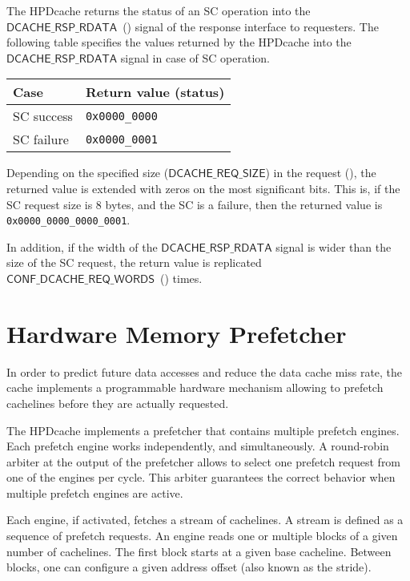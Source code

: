 \documentclass[10pt,titlepage,twoside]{book}
\begin{document}
The \ac{HPDcache} returns the status of an \ac{SC} operation into the $\mathsf{DCACHE\_RSP\_RDATA}$~() signal of the response interface to requesters.
The following table specifies the values returned by the \ac{HPDcache} into the $\mathsf{DCACHE\_RSP\_RDATA}$ signal in case of \ac{SC} operation.

\begin{center}
  {\small%
    \begin{tabular}{p{.15\linewidth}p{.20\linewidth}}
    \toprule
    \textbf{Case}
    & \textbf{Return value (status)}\\
    \midrule
    SC success
    & \texttt{0x0000\_0000} \\
    \midrule
    SC failure
    & \texttt{0x0000\_0001} \\
    \bottomrule
  \end{tabular}}
\end{center}

Depending on the specified size ($\mathsf{DCACHE\_REQ\_SIZE}$) in the request (), the returned value is extended with zeros on the most significant bits.
This is, if the SC request size is 8 bytes, and the SC is a failure, then the returned value is \texttt{0x0000\_0000\_0000\_0001}.

In addition, if the width of the $\mathsf{DCACHE\_RSP\_RDATA}$ signal is wider than the size of the SC request, the return value is replicated $\mathsf{CONF\_DCACHE\_REQ\_WORDS}$~() times.


\chapter{Hardware Memory Prefetcher}
\minitoc
\newpage

In order to predict future data accesses and reduce the data cache miss rate, the cache implements a programmable hardware mechanism allowing to prefetch cachelines before they are actually requested.

The \ac{HPDcache} implements a prefetcher that contains multiple prefetch engines.
Each prefetch engine works independently, and simultaneously.
A round-robin arbiter at the output of the prefetcher allows to select one prefetch request from one of the engines per cycle.
This arbiter guarantees the correct behavior when multiple prefetch engines are active.

Each engine, if activated, fetches a stream of cachelines.
A stream is defined as a sequence of prefetch requests.
An engine reads one or multiple blocks of a given number of cachelines.
The first block starts at a given base cacheline.
Between blocks, one can configure a given address offset (also known as the stride).
\end{document}
